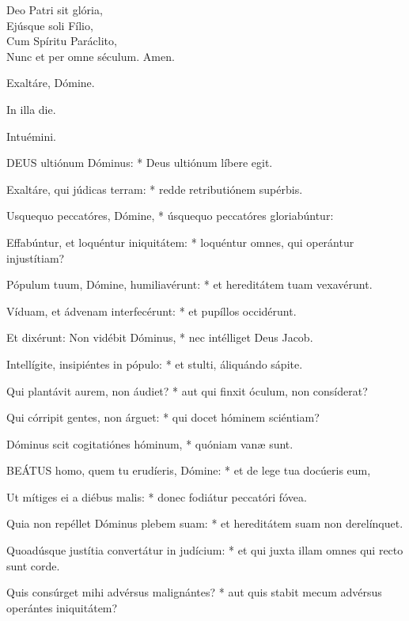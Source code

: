 Deo Patri sit glória,\\
Ejúsque soli Fílio,\\
Cum Spíritu Paráclito,\\
Nunc et per omne séculum. Amen.

  Exaltáre, Dómine.


  In illa die.

  Intuémini.


\lettrine[lines=2]{D}{EUS} ultiónum Dóminus: * Deus ultiónum líbere egit.

Exaltáre, qui júdicas terram: * redde retributiónem supérbis.

Usquequo peccatóres, Dómine, * úsquequo peccatóres gloriabúntur:

Effabúntur, et loquéntur iniquitátem: * loquéntur omnes, qui operántur injustítiam?

Pópulum tuum, Dómine, humiliavérunt: * et hereditátem tuam vexavérunt.

Víduam, et ádvenam interfecérunt: * et pupíllos occidérunt.

Et dixérunt: Non vidébit Dóminus, * nec intélliget Deus Jacob.

Intellígite, insipiéntes in pópulo: * et stulti, áliquándo sápite.

Qui plantávit aurem, non áudiet? * aut qui finxit óculum, non consíderat?

Qui córripit gentes, non árguet: * qui docet hóminem sciéntiam?

Dóminus scit cogitatiónes hóminum, * quóniam vanæ sunt.


\lettrine[lines=2]{B}{EÁTUS} homo, quem tu erudíeris, Dómine: * et de lege tua docúeris eum,

Ut mítiges ei a diébus malis: * donec fodiátur peccatóri fóvea.

Quia non repéllet Dóminus plebem suam: * et hereditátem suam non derelínquet.

Quoadúsque justítia convertátur in judícium: * et qui juxta illam omnes qui recto sunt corde.

Quis consúrget mihi advérsus malignántes? * aut quis stabit mecum advérsus operántes iniquitátem?

